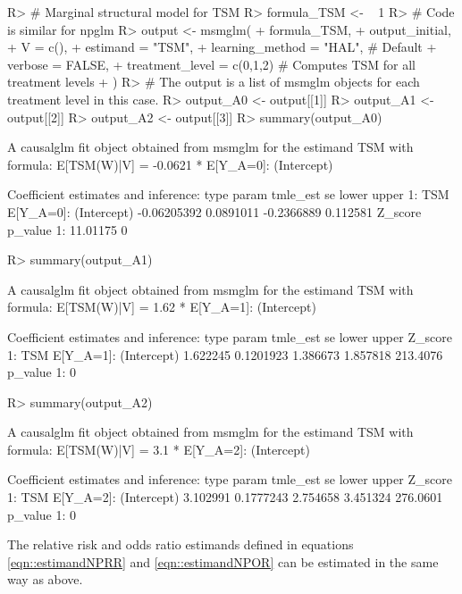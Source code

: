 \documentclass[
]{jss}
\begin{document}
\begin{CodeChunk}
\begin{CodeInput}
R> # Marginal structural model for TSM
R> formula_TSM <- ~ 1  
R> # Code is similar for npglm
R> output <- msmglm( 
+       formula_TSM, 
+       output_initial,
+       V = c(),
+       estimand = "TSM", 
+       learning_method = "HAL", # Default
+       verbose = FALSE,
+       treatment_level = c(0,1,2) # Computes TSM for all treatment levels
+       )
R> # The output is a list of msmglm objects for each treatment level in this case.
R> output_A0 <- output[[1]]
R> output_A1 <- output[[2]]
R> output_A2 <- output[[3]]
R> summary(output_A0)
\end{CodeInput}
\begin{CodeOutput}
A causalglm fit object obtained from msmglm for the estimand TSM with formula: 
E[TSM(W)|V] = -0.0621 * E[Y_{A=0}]: (Intercept)

Coefficient estimates and inference:
   type                   param    tmle_est        se      lower    upper
1:  TSM E[Y_{A=0}]: (Intercept) -0.06205392 0.0891011 -0.2366889 0.112581
    Z_score p_value
1: 11.01175       0
\end{CodeOutput}
\begin{CodeInput}
R> summary(output_A1)
\end{CodeInput}
\begin{CodeOutput}
A causalglm fit object obtained from msmglm for the estimand TSM with formula: 
E[TSM(W)|V] = 1.62 * E[Y_{A=1}]: (Intercept)

Coefficient estimates and inference:
   type                   param tmle_est        se    lower    upper  Z_score
1:  TSM E[Y_{A=1}]: (Intercept) 1.622245 0.1201923 1.386673 1.857818 213.4076
   p_value
1:       0
\end{CodeOutput}
\begin{CodeInput}
R> summary(output_A2)
\end{CodeInput}
\begin{CodeOutput}
A causalglm fit object obtained from msmglm for the estimand TSM with formula: 
E[TSM(W)|V] = 3.1 * E[Y_{A=2}]: (Intercept)

Coefficient estimates and inference:
   type                   param tmle_est        se    lower    upper  Z_score
1:  TSM E[Y_{A=2}]: (Intercept) 3.102991 0.1777243 2.754658 3.451324 276.0601
   p_value
1:       0
\end{CodeOutput}
\end{CodeChunk}

The relative risk and odds ratio estimands defined in equations
\ref{eqn::estimandNPRR} and \ref{eqn::estimandNPOR} can be estimated in
the same way as above.
\end{document}
